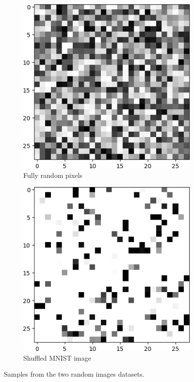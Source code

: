 \documentclass[12pt,oneside]{CUNY_PhD}
\begin{document}
\begin{figure}[!htbp]
    \centering
    \begin{subfigure}[t]{0.49\textwidth}
        \includegraphics[width=\textwidth]{images/mnist-behavior/MNIST-Sample-random-noise-fixed.png}
        \caption*{Fully random pixels}
    \end{subfigure}
    \begin{subfigure}[t]{0.49\textwidth}
        \includegraphics[width=\textwidth]{images/mnist-behavior/MNIST-Sample-random-shuffled-noise-fixed.png}
        \caption*{Shuffled MNIST image}
    \end{subfigure}
    \caption{Samples from the two random images datasets.}
    \label{fig:randoms}
\end{figure}
\end{document}
